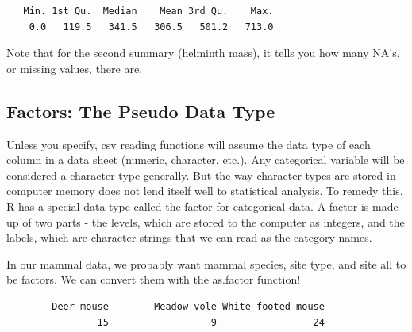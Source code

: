 \documentclass[
  letterpaper,
  DIV=11,
  numbers=noendperiod]{scrreprt}
\newenvironment{Shaded}{\begin{snugshade}}{\end{snugshade}}
\newcommand{\DocumentationTok}[1]{\textcolor[rgb]{0.37,0.37,0.37}{\textit{#1}}}
\newcommand{\FunctionTok}[1]{\textcolor[rgb]{0.28,0.35,0.67}{#1}}
\newcommand{\NormalTok}[1]{\textcolor[rgb]{0.00,0.23,0.31}{#1}}
\newcommand{\OtherTok}[1]{\textcolor[rgb]{0.00,0.23,0.31}{#1}}
\newcommand{\SpecialCharTok}[1]{\textcolor[rgb]{0.37,0.37,0.37}{#1}}
\begin{document}
\begin{verbatim}
   Min. 1st Qu.  Median    Mean 3rd Qu.    Max. 
    0.0   119.5   341.5   306.5   501.2   713.0 
\end{verbatim}

Note that for the second summary (helminth mass), it tells you how many
NA's, or missing values, there are.

\subsection{Factors: The Pseudo Data Type}\label{sec-factors}

Unless you specify, csv reading functions will assume the data type of
each column in a data sheet (numeric, character, etc.). Any categorical
variable will be considered a character type generally. But the way
character types are stored in computer memory does not lend itself well
to statistical analysis. To remedy this, R has a special data type
called the factor for categorical data. A factor is made up of two parts
- the levels, which are stored to the computer as integers, and the
labels, which are character strings that we can read as the category
names.

In our mammal data, we probably want mammal species, site type, and site
all to be factors. We can convert them with the as.factor function!

\begin{Shaded}
\end{Shaded}

\begin{verbatim}
        Deer mouse        Meadow vole White-footed mouse 
                15                  9                 24 
\end{verbatim}
\end{document}
